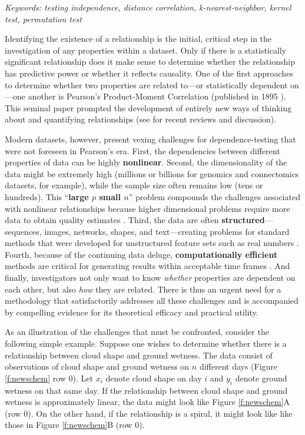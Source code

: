 \documentclass[11pt]{article}
\begin{document}
\noindent%
{\it Keywords: testing independence, distance correlation, k-nearest-neighbor, kernel test, permutation test}

\clearpage
\setcounter{tocdepth}{2}

Identifying the existence of a relationship is the initial, critical step in the investigation of any properties within a dataset. Only if there is a statistically significant relationship does it make sense to determine whether the relationship has predictive power or whether it reflects causality.
One of the first approaches to determine whether two properties are related to---or statistically dependent on---one another is Pearson's Product-Moment Correlation (published in 1895 \cite{Pearson1895}). This seminal paper prompted the development of  entirely new ways of thinking about and quantifying relationships (see \cite{Reimherr2013,JosseHolmes2013} for  recent reviews and discussion).


Modern datasets, however, present vexing challenges for dependence-testing that were not foreseen in Pearson's era.
%
First, the dependencies between different properties 
of data can be highly \textbf{nonlinear}.
% 
Second, the dimensionality of the data might be extremely high (millions or billions for genomics and connectomics datasets, for example), while the sample size often remains low (tens or hundreds).  This ``\textbf{large $p$ small $n$}'' problem compounds the challenges associated with nonlinear relationships because higher dimensional problems require more data to obtain quality estimates \cite{johnstone2009statistical}.
% 
Third, the data are often \textbf{structured}---sequences, images, networks, shapes, and text---creating problems for standard methods that were developed for unstructured feature sets such as real numbers \cite{bakir2007predicting}.
% 
Fourth, because of the continuing data deluge,  \textbf{computationally efficient} methods are critical for generating results within acceptable time frames \cite{hey2009fourth}.
%
And finally, investigators not only want to know \textit{whether}  properties are dependent on each other, but also \textit{how} they are related.
There is thus an urgent need for a methodology that satisfactorily addresses all these challenges and is accompanied by compelling evidence for its theoretical efficacy and practical utility.


As an illustration of the challenges that must be confronted, consider the following simple example.
Suppose one wishes to determine whether there is a relationship between cloud shape and ground wetness.  The data consist of observations of cloud shape and ground wetness on $n$ different days (Figure \ref{f:newschem} row 0).
Let $x_i$ denote cloud shape on day $i$ and $y_i$ denote ground wetness on that same day. 
If the relationship between cloud shape and ground wetness is approximately linear, the data might look like Figure \ref{f:newschem}{\color{magenta}A} (row 0). 
On the other hand, if the relationship is a spiral, it might look like
like those in Figure \ref{f:newschem}{\color{magenta}B} (row 0).
\end{document}
